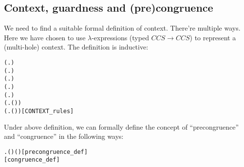 
\subsection{Context, guardness and (pre)congruence}

We need to find a suitable formal definition of 
context. There're multiple ways. Here we have chosen to use $\lambda$-expressions (typed
$CCS\rightarrow CCS$) to represent a (multi-hole) 
context. The definition is inductive:
\begin{alltt}
 (\HOLTokenLambda{}. )
 (\HOLTokenLambda{}. )
  \HOLSymConst{\HOLTokenImp{}}  (\HOLTokenLambda{}.  )
  \HOLSymConst{\HOLTokenConj{}}   \HOLSymConst{\HOLTokenImp{}}  (\HOLTokenLambda{}.   \HOLSymConst{+}  )
  \HOLSymConst{\HOLTokenConj{}}   \HOLSymConst{\HOLTokenImp{}}  (\HOLTokenLambda{}.   \HOLSymConst{\ensuremath{\parallel}}  )
  \HOLSymConst{\HOLTokenImp{}}  (\HOLTokenLambda{}. \HOLSymConst{\ensuremath{\nu}}  ( ))
  \HOLSymConst{\HOLTokenImp{}}  (\HOLTokenLambda{}.  ( ) )\hfill{[CONTEXT_rules]}
\end{alltt}

Under above definition, we can formally define the concept of
``precongruence'' and ``congruence'' in the following ways:
\begin{alltt}
  \HOLSymConst{\HOLTokenEquiv{}}
\HOLSymConst{\HOLTokenForall{}}  .   \HOLSymConst{\HOLTokenImp{}}    \HOLSymConst{\HOLTokenImp{}}  ( ) ( )\hfill{[precongruence_def]}
  \HOLSymConst{\HOLTokenEquiv{}}   \HOLSymConst{\HOLTokenConj{}}  \hfill{[congruence_def]}
\end{alltt}

